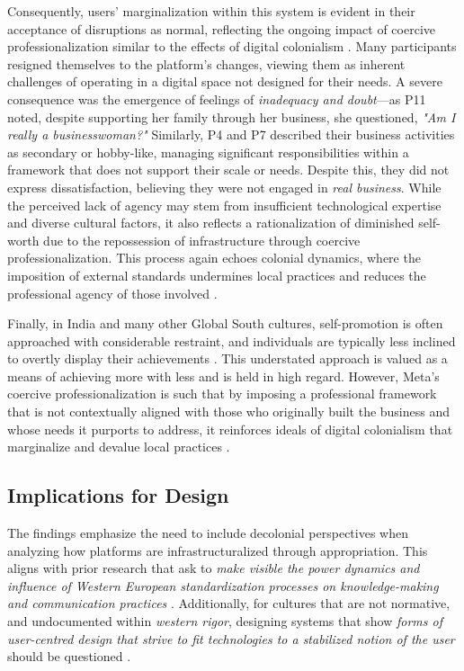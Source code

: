 Consequently, users' marginalization within this system is evident in their acceptance of disruptions as normal, reflecting the ongoing impact of coercive professionalization similar to the effects of digital colonialism \cite{Sturmer2021}. Many participants resigned themselves to the platform’s changes, viewing them as inherent challenges of operating in a digital space not designed for their needs. A severe consequence was the emergence of feelings of \textit{inadequacy and doubt}—as P11 noted, despite supporting her family through her business, she questioned, \textit{"Am I really a businesswoman?"} Similarly, P4 and P7 described their business activities as secondary or hobby-like, managing significant responsibilities within a framework that does not support their scale or needs. Despite this, they did not express dissatisfaction, believing they were not engaged in \textit{real business}. While the perceived lack of agency may stem from insufficient technological expertise and diverse cultural factors, it also reflects a rationalization of diminished self-worth due to the repossession \cite{doi:10.1177/1461444816629474} of infrastructure through coercive professionalization. This process again echoes colonial dynamics, where the imposition of external standards undermines local practices and reduces the professional agency of those involved \cite{10.1145/3274340}. 

Finally, in India and many other Global South cultures, self-promotion is often approached with considerable restraint, and individuals are typically less inclined to overtly display their achievements \cite{merkin2018individualism}. This understated approach is valued as a means of achieving more with less and is held in high regard. However, Meta's coercive professionalization is such that by imposing a professional framework that is not contextually aligned with those who originally built the business and whose needs it purports to address, it reinforces ideals of digital colonialism that marginalize and devalue local practices \cite{10.1145/3274340}.







\subsection{Implications for Design}

The findings emphasize the need to include decolonial perspectives when analyzing how platforms are infrastructuralized through appropriation. This aligns with prior research that ask to \textit{make visible the power dynamics and influence of Western European standardization processes on knowledge-making and communication practices} \cite{10.1145/3328020.3353927, 10.1145/3283458.3283497}. Additionally, for cultures that are not normative, and undocumented within \textit{western rigor}, designing systems that show \textit{forms of user-centred design that strive to fit technologies to a stabilized notion of the user} should be questioned \cite{doi:10.1177/0162243910389594, 10.1145/2662155.2662195}. 


